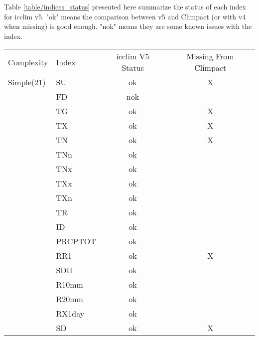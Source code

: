 \documentclass[a4paper,11pt]{article}
\begin{document}
    Table \ref{table/indices_status} presented here summarize the status of each index for icclim v5.
    "ok" means the comparison between v5 and Climpact (or with v4 when missing) is good enough.
    "nok" means they are some known issues with the index.
    \begin{table}[h]
    \begin{tabular}{l l c c}
        Complexity   &  Index    & icclim V5 Status & Missing From Climpact \\
        Simple(21)   &  SU       &   ok             &          X            \\
                     &  FD       &   nok            &                       \\
                     &  TG       &   ok             &          X            \\
                     &  TX       &   ok             &          X            \\
                     &  TN       &   ok             &          X            \\
                     &  TNn      &   ok             &                       \\
                     &  TNx      &   ok             &                       \\
                     &  TXx      &   ok             &                       \\
                     &  TXn      &   ok             &                       \\
                     &  TR       &   ok             &                       \\
                     &  ID       &   ok             &                       \\
                     &  PRCPTOT  &   ok             &                       \\       
                     &  RR1      &   ok             &          X            \\
                     &  SDII     &   ok             &                       \\       
                     &  R10mm    &   ok             &                       \\       
                     &  R20mm    &   ok             &                       \\       
                     &  RX1day   &   ok             &                       \\       
                     &  SD       &   ok             &          X            \\

\end{tabular}
\end{table}
\end{document}
